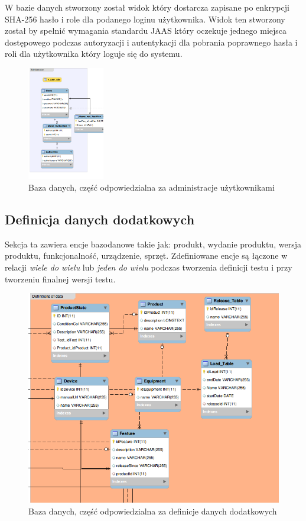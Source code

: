 W bazie danych stworzony został widok który dostarcza zapisane po enkrypcji SHA-256 hasło i role dla podanego loginu użytkownika. Widok ten stworzony został by spełnić wymagania standardu JAAS który oczekuje jednego miejsca dostępowego podczas autoryzacji i autentykacji dla pobrania poprawnego hasła i roli dla użytkownika który loguje się do systemu.
\begin{figure}[h!]
	\centering
		\includegraphics[width=0.3\textwidth]{img/bazaDanychAdministracja.png}  %
	\caption{Baza danych, część odpowiedzialna za administracje użytkownikami}
	\label{fig:bazaAdmin}
\end{figure}
\subsection{Definicja danych dodatkowych}   

Sekcja ta zawiera encje bazodanowe takie jak: produkt, wydanie produktu, wersja produktu, funkcjonalność, urządzenie, sprzęt. Zdefiniowane encje są łączone w relacji \textit{wiele do wielu} lub \textit{jeden do wielu} podczas tworzenia definicji testu i przy tworzeniu finalnej wersji testu.
   \begin{figure}[h]
\centerline{\includegraphics[scale=0.5]{img/bazaDanychDefinicjaDanych.png}}
 \label{fig:bazaDane}
      \caption{Baza danych, część odpowiedzialna za definicje danych dodatkowych}
\end{figure}

